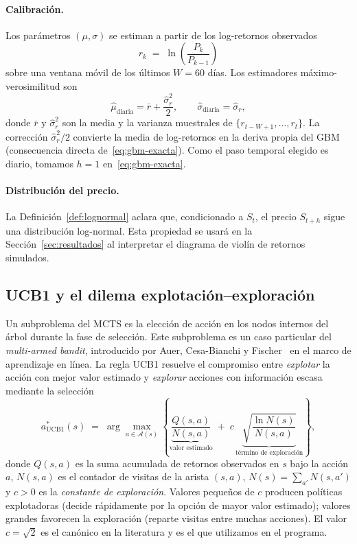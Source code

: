 \paragraph{Calibración.} Los parámetros $(\mu, \sigma)$ se estiman a partir de los log-retornos observados
\[
    r_k \;=\; \ln\!\left(\frac{P_{k}}{P_{k-1}}\right)
\]
sobre una ventana móvil de los últimos $W = 60$ días. Los estimadores máximo-verosimilitud son
\[
    \hat{\mu}_{\mathrm{diaria}} = \bar{r} + \frac{\hat\sigma_r^2}{2}, \qquad \hat\sigma_{\mathrm{diaria}} = \hat\sigma_r,
\]
donde $\bar r$ y $\hat\sigma_r^2$ son la media y la varianza muestrales de $\{r_{t-W+1}, \ldots, r_t\}$. La corrección $\hat\sigma_r^2/2$ convierte la media de log-retornos en la deriva propia del GBM (consecuencia directa de~\eqref{eq:gbm-exacta}). Como el paso temporal elegido es diario, tomamos $h = 1$ en~\eqref{eq:gbm-exacta}.

\paragraph{Distribución del precio.} La Definición~\ref{def:lognormal} aclara que, condicionado a $S_t$, el precio $S_{t+h}$ sigue una distribución log-normal. Esta propiedad se usará en la Sección~\ref{sec:resultados} al interpretar el diagrama de violín de retornos simulados.

\subsection{UCB1 y el dilema explotación--exploración}
\label{subsec:ucb1}

Un subproblema del MCTS es la elección de acción en los nodos internos del árbol durante la fase de selección. Este subproblema es un caso particular del \emph{multi-armed bandit}, introducido por Auer, Cesa-Bianchi y Fischer~\cite{auer2002} en el marco de aprendizaje en línea. La regla UCB1 resuelve el compromiso entre \emph{explotar} la acción con mejor valor estimado y \emph{explorar} acciones con información escasa mediante la selección
\begin{equation}
    a^*_{\text{UCB1}}(s) \;=\; \arg\max_{a \in \mathcal{A}(s)} \left\{ \underbrace{\frac{Q(s,a)}{N(s,a)}}_{\text{valor estimado}} \;+\; c\, \underbrace{\sqrt{\frac{\ln N(s)}{N(s,a)}}}_{\text{término de exploración}} \right\},
    \label{eq:ucb1}
\end{equation}
donde $Q(s,a)$ es la suma acumulada de retornos observados en $s$ bajo la acción $a$, $N(s,a)$ es el contador de visitas de la arista $(s,a)$, $N(s) = \sum_{a'} N(s,a')$ y $c > 0$ es la \emph{constante de exploración}. Valores pequeños de $c$ producen políticas explotadoras (decide rápidamente por la opción de mayor valor estimado); valores grandes favorecen la exploración (reparte visitas entre muchas acciones). El valor $c = \sqrt{2}$ es el canónico en la literatura y es el que utilizamos en el programa.

